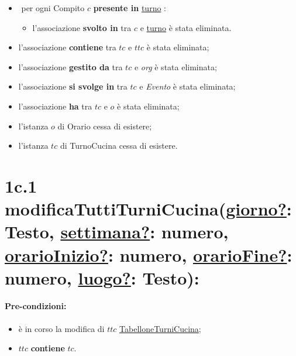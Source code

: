 \begin{itemize}
   \item \textlangle $ $ per ogni Compito $c$ \textbf{presente in} \underline{turno} \textrangle:
    \begin{itemize}
        \item l'associazione \textbf{svolto in} tra $c$ e \underline{turno} è stata eliminata.
    \end{itemize}
    \item l'associazione \textbf{contiene} tra $tc$ e $ttc$ è stata eliminata;
    \item l'associazione \textbf{gestito da} tra $tc$ e \textit{org} è stata eliminata;
\item l'associazione \textbf{si svolge in} tra $tc$ e \textit{Evento} è stata eliminata;
    \item l'associazione \textbf{ha} tra $tc$ e $o$ è stata eliminata;
    \item l'istanza $o$ di Orario cessa di esistere;
    \item l'istanza $tc$ di TurnoCucina cessa di esistere.
\end{itemize}

\section*{1c.1 modificaTuttiTurniCucina(\underline{giorno?}: Testo, \underline{settimana?}: numero, \underline{orarioInizio?}: numero, \underline{orarioFine?}: numero, \underline{luogo?}: Testo):}

\paragraph{Pre-condizioni:}
\begin{itemize}
 \item è in corso la modifica di $ttc$ \underline{TabelloneTurniCucina};
 \item $ttc$ \textbf{contiene} $tc$.
\end{itemize}


